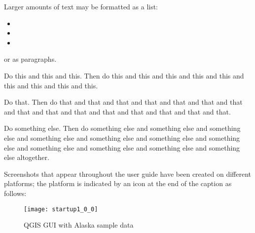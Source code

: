 Larger amounts of text may be formatted as a list:
\begin{itemize}
\item {} 
\item {} 
\item {}
\end{itemize}
or as paragraphs.

\nix{}Do this and this and this. Then do this
and this and this
and this and this
and this and this
and this and this.

\win{}Do that. Then do that
and that and that
and that and that
and that and that
and that and that
and that and that
and that and that
and that and that.

\osx{}Do something else. 
Then do something else and 
something else and
something else and
something else and
something else and
something else and
something else and
something else and
something else and
something else and
something else altogether.

Screenshots that appear throughout the user guide have been created on
different platforms; the platform is indicated by an icon at the end of the
caption as follows:

\begin{figure}[ht]
   \begin{center}
   \caption{QGIS GUI with Alaska sample data \wincaption}
	 \label{fig:startupconventions}
   \texttt{[image: startup1\_0\_0]}
\end{center} 
\end{figure}


